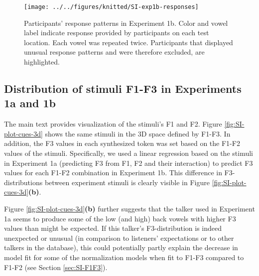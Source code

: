 \documentclass[preprint]{JASA}
\begin{document}
\begin{figure}[!ht]

{\centering \texttt{[image: ../../figures/knitted/SI-exp1b-responses]} 

}

\caption{Participants' response patterns in Experiment 1b. Color and vowel label indicate response provided by participants on each test location. Each vowel was repeated twice. Participants that displayed unusual response patterns and were therefore excluded, are highlighted.}\label{fig:SI-exp1b-responses}
\end{figure}

\subsection{Distribution of stimuli F1-F3 in Experiments 1a and 1b}\label{distribution-of-stimuli-f1-f3-in-experiments-1a-and-1b}

The main text provides visualization of the stimuli's F1 and F2. Figure \ref{fig:SI-plot-cues-3d} shows the same stimuli in the 3D space defined by F1-F3. In addition, the F3 values in each synthesized token was set based on the F1-F2 values of the stimuli. Specifically, we used a linear regression based on the stimuli in Experiment 1a (predicting F3 from F1, F2 and their interaction) to predict F3 values for each F1-F2 combination in Experiment 1b. This difference in F3-distributions between experiment stimuli is clearly visible in Figure \ref{fig:SI-plot-cues-3d}\textbf{(b)}.

Figure \ref{fig:SI-plot-cues-3d}\textbf{(b)} further suggests that the talker used in Experiment 1a seems to produce some of the low (and high) back vowels with higher F3 values than might be expected. If this talker's F3-distribution is indeed unexpected or unusual (in comparison to listeners' expectations or to other talkers in the database), this could potentially partly explain the decrease in model fit for some of the normalization models when fit to F1-F3 compared to F1-F2 (see Section \ref{sec:SI-F1F3}).
\end{document}
